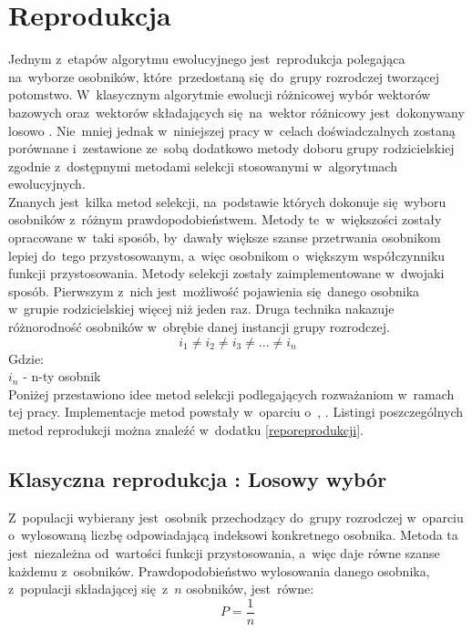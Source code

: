 \chapter{Reprodukcja}\label{metody_reprodukcji}

Jednym z~etapów algorytmu ewolucyjnego jest~reprodukcja polegająca na~wyborze osobników, które~przedostaną się~do~grupy rozrodczej tworzącej potomstwo. W~klasycznym algorytmie ewolucji różnicowej wybór wektorów bazowych oraz~wektorów składających się~na~wektor różnicowy jest~dokonywany losowo \cite{diff2}. Nie~mniej jednak w~niniejszej pracy w~celach doświadczalnych zostaną porównane i~zestawione ze~sobą dodatkowo metody doboru grupy rodzicielskiej zgodnie z~dostępnymi metodami selekcji stosowanymi w~algorytmach ewolucyjnych.\\

Znanych jest~kilka metod selekcji, na~podstawie których dokonuje się~wyboru osobników z~różnym prawdopodobieństwem. Metody te~w~większości zostały opracowane w~taki sposób, by~dawały większe szanse przetrwania osobnikom lepiej do~tego przystosowanym, a~więc osobnikom o~większym współczynniku funkcji przystosowania. Metody selekcji zostały zaimplementowane w~dwojaki sposób. Pierwszym z~nich jest~możliwość pojawienia się~danego osobnika w~grupie rodzicielskiej więcej niż jeden raz. Druga technika nakazuje różnorodność osobników w~obrębie danej instancji grupy rozrodczej.\\

\begin{equation}
i_{1} \ne i_{2} \ne i_{3} \ne ... \ne i_{n}
\end{equation}
Gdzie:\\
$i_{n}$ - n-ty osobnik\\

Poniżej przestawiono idee metod selekcji podlegających rozważaniom w~ramach tej pracy. Implementacje metod powstały w~oparciu o~\cite{maszynowe_sel}, \cite{gracjan}. Listingi poszczególnych metod reprodukcji można znaleźć w~dodatku \ref{reporeprodukcji}.


\section{Klasyczna reprodukcja : Losowy wybór}\label{sec:strukturaDokumentu}

Z~populacji wybierany jest~osobnik przechodzący do~grupy rozrodczej w~oparciu o~wylosowaną liczbę odpowiadającą indeksowi konkretnego osobnika. Metoda ta jest~niezależna od~wartości funkcji przystosowania, a~więc daje równe szanse każdemu z~osobników. Prawdopodobieństwo wylosowania danego osobnika, z~populacji składającej się~z~$n$ osobników, jest~równe:
\vspace{0,4cm}
\begin{equation}
P = \frac{1}{n}
\end{equation}


